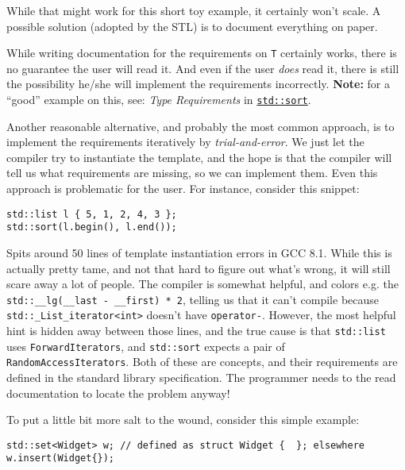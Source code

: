     While that might work for this short toy example, it certainly won't scale. A possible solution (adopted by the STL) is to document everything on paper.

    

    While writing documentation for the requirements on \texttt{T} certainly works, there is no guarantee the user will read it. And even if the user \emph{does} read it, there is still the possibility he/she will implement the requirements incorrectly. \textbf{Note:} for a ``good'' example on this, see: \emph{Type Requirements} in \href{https://en.cppreference.com/w/cpp/algorithm/sort}{\texttt{std::sort}}.

    Another reasonable alternative, and probably the most common approach, is to implement the requirements iteratively by \emph{trial-and-error}. We just let the compiler try to instantiate the template, and the hope is that the compiler will tell us what requirements are missing, so we can implement them. Even this approach is problematic for the user. For instance, consider this snippet:

    \begin{lstlisting}
std::list l { 5, 1, 2, 4, 3 };
std::sort(l.begin(), l.end()); \end{lstlisting}

\noindent Spits around 50 lines of template instantiation errors in GCC 8.1. While this is actually pretty tame, and not that hard to figure out what's wrong, it will still scare away a lot of people. The compiler is somewhat helpful, and colors e.g. the \texttt{std::\_\_lg(\_\_last - \_\_first) * 2}, telling us that it can't compile because \texttt{std::\_List\_iterator<int>} doesn't have \texttt{operator-}. However, the most helpful hint is hidden away between those lines, and the true cause is that \texttt{std::list} uses \texttt{ForwardIterators}, and \texttt{std::sort} expects a pair of \texttt{RandomAccessIterators}. Both of these are concepts, and their requirements are defined in the standard library specification. The programmer needs to the read documentation to locate the problem anyway!

To put a little bit more salt to the wound, consider this simple example:

    \begin{lstlisting}
std::set<Widget> w; // defined as struct Widget {  }; elsewhere
w.insert(Widget{}); \end{lstlisting}

